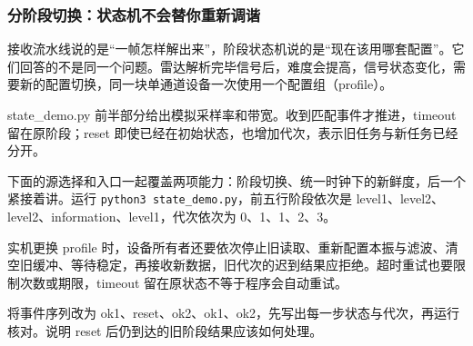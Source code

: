 \subsubsection{分阶段切换：状态机不会替你重新调谐}
接收流水线说的是“一帧怎样解出来”，阶段状态机说的是“现在该用哪套配置”。它们回答的不是同一个问题。雷达解析完毕信号后，难度会提高，信号状态变化，需要新的配置切换，同一块单通道设备一次使用一个配置组（profile）。
\begin{example}[先检查阶段与事件是否对得上]
state\_demo.py 前半部分给出模拟采样率和带宽。收到匹配事件才推进，timeout 留在原阶段；reset 即使已经在初始状态，也增加代次，表示旧任务与新任务已经分开。
\begin{sdrblock}

\end{sdrblock}
下面的源选择和入口一起覆盖两项能力：阶段切换、统一时钟下的新鲜度，后一个紧接着讲。运行 \texttt{python3 state\_demo.py}，前五行阶段依次是 level1、level2、level2、information、level1，代次依次为 0、1、1、2、3。
\begin{sdrblock}

\end{sdrblock}
实机更换 profile 时，设备所有者还要依次停止旧读取、重新配置本振与滤波、清空旧缓冲、等待稳定，再接收新数据，旧代次的迟到结果应拒绝。超时重试也要限制次数或期限，timeout 留在原状态不等于程序会自动重试。
\end{example}
\begin{exercise}\label{ex:v2-sdr-stages}
将事件序列改为 ok1、reset、ok2、ok1、ok2，先写出每一步状态与代次，再运行核对。说明 reset 后仍到达的旧阶段结果应该如何处理。
\end{exercise}

